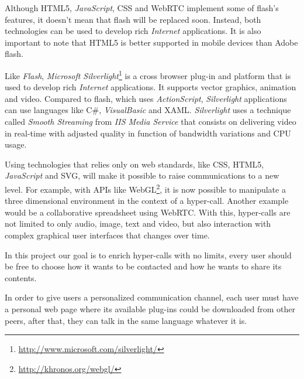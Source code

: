   Although \ac{HTML}5, \emph{JavaScript}, \ac{CSS} and \ac{WebRTC} implement some of flash's features, it doesn't mean that flash will be replaced soon.
  Instead, both technologies can be used to develop rich \emph{Internet} applications.
  It is also important to note that \ac{HTML}5 is better supported in mobile devices than Adobe flash. 

  Like \emph{Flash}, \emph{Microsoft Silverlight}\footnote{\url{http://www.microsoft.com/silverlight/}} is a cross browser plug-in and platform that is used to develop rich \emph{Internet} applications. It supports vector graphics, animation and video. Compared to flash, which uses \emph{ActionScript}, \emph{Silverlight} applications can use languages like C\#, \emph{VisualBasic} and \ac{XAML}. \emph{Silverlight} uses a technique called \emph{Smooth Streaming} from \emph{IIS Media Service} that consists on delivering video in real-time with adjusted quality in function of bandwidth variations and \ac{CPU} usage.

  Using technologies that relies only on web standards, like \ac{CSS}, \ac{HTML}5, \emph{JavaScript} and \ac{SVG}, will make it possible to raise communications to a new level.
  For example, with \ac{API}s like WebGL\footnote{\url{http://khronos.org/webgl/}}, it is now possible to manipulate a three dimensional environment in the context of a hyper-call. Another example would be a collaborative spreadsheet using \ac{WebRTC}. With this, hyper-calls are not limited to only audio, image, text and video, but also interaction with complex graphical user interfaces that changes over time.

  In this project our goal is to enrich hyper-calls with no limits, every user should be free to choose how it wants to be contacted and how he wants to share its contents.
  
  In order to give users a personalized communication channel, each user must have a personal web page where its available plug-ins could be downloaded from other peers, after that, they can talk in the same language whatever it is.
